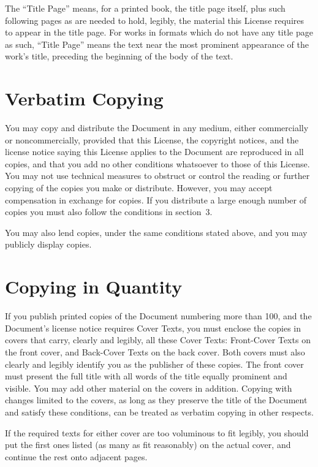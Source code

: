 The ``Title Page'' means, for a printed book, the title page itself,
plus such following pages as are needed to hold, legibly, the material
this License requires to appear in the title page.  For works in
formats which do not have any title page as such, ``Title Page'' means
the text near the most prominent appearance of the work's title,
preceding the beginning of the body of the text.


\section{Verbatim Copying}

You may copy and distribute the Document in any medium, either
commercially or noncommercially, provided that this License, the
copyright notices, and the license notice saying this License applies
to the Document are reproduced in all copies, and that you add no other
conditions whatsoever to those of this License.  You may not use
technical measures to obstruct or control the reading or further
copying of the copies you make or distribute.  However, you may accept
compensation in exchange for copies.  If you distribute a large enough
number of copies you must also follow the conditions in section~3.

You may also lend copies, under the same conditions stated above, and
you may publicly display copies.


\section{Copying in Quantity}

If you publish printed copies of the Document numbering more than 100,
and the Document's license notice requires Cover Texts, you must enclose
the copies in covers that carry, clearly and legibly, all these Cover
Texts: Front-Cover Texts on the front cover, and Back-Cover Texts on
the back cover.  Both covers must also clearly and legibly identify
you as the publisher of these copies.  The front cover must present
the full title with all words of the title equally prominent and
visible.  You may add other material on the covers in addition.
Copying with changes limited to the covers, as long as they preserve
the title of the Document and satisfy these conditions, can be treated
as verbatim copying in other respects.

If the required texts for either cover are too voluminous to fit
legibly, you should put the first ones listed (as many as fit
reasonably) on the actual cover, and continue the rest onto adjacent
pages.

